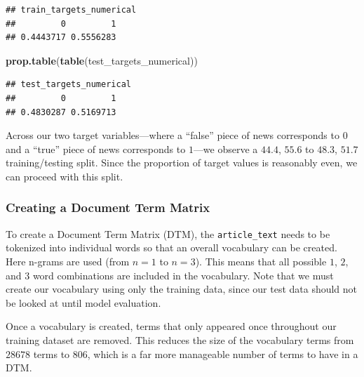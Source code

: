 \documentclass[12pt]{article}
\newenvironment{Shaded}{\begin{snugshade}}{\end{snugshade}}
\newcommand{\KeywordTok}[1]{\textcolor[rgb]{0.13,0.29,0.53}{\textbf{#1}}}
\newcommand{\NormalTok}[1]{#1}
\begin{document}
\begin{verbatim}
## train_targets_numerical
##         0         1 
## 0.4443717 0.5556283
\end{verbatim}

\begin{Shaded}
\begin{Highlighting}[]
\KeywordTok{prop.table}\NormalTok{(}\KeywordTok{table}\NormalTok{(test_targets_numerical))}
\end{Highlighting}
\end{Shaded}

\begin{verbatim}
## test_targets_numerical
##         0         1 
## 0.4830287 0.5169713
\end{verbatim}

Across our two target variables---where a ``false'' piece of news
corresponds to \(0\) and a ``true'' piece of news corresponds to
\(1\)---we observe a \(44.4%
\), \(55.6%
\) to \(48.3%
\), \(51.7%
\) training/testing split. Since the proportion of target values is
reasonably even, we can proceed with this split.

\hypertarget{creating-a-document-term-matrix}{%
\subsubsection{Creating a Document Term
Matrix}\label{creating-a-document-term-matrix}}

\label{sec:feature-extraction}

To create a Document Term Matrix (DTM), the \texttt{article\_text} needs
to be tokenized into individual words so that an overall vocabulary can
be created. Here n-grams are used (from \(n=1\) to \(n=3\)). This means
that all possible \(1\), \(2\), and \(3\) word combinations are included
in the vocabulary. Note that we must create our vocabulary using only
the training data, since our test data should not be looked at until
model evaluation.

Once a vocabulary is created, terms that only appeared once throughout
our training dataset are removed. This reduces the size of the
vocabulary terms from \(28678\) terms to \(806\), which is a far more
manageable number of terms to have in a DTM.
\end{document}
